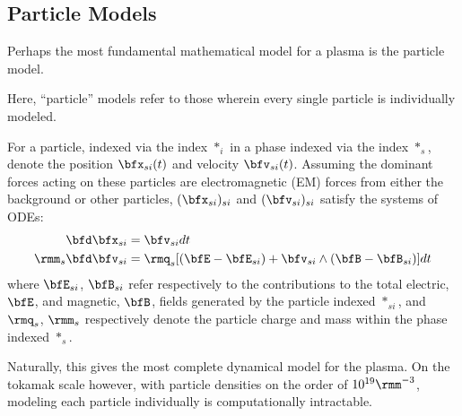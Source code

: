 \subsection{Particle Models}\label{cha:particle models}
    Perhaps the most fundamental mathematical model for a plasma is the particle model.

    \line

    \begin{definition}\label{def:particle model}
        Here, ``particle'' models refer to those wherein every single particle is individually modeled.
    \end{definition}
    
    \line

    For a particle, indexed via the index $*_{i}$ in a phase indexed via the index $*_{s}$, denote the position $\bfx_{si}(t)$ and velocity $\bfv_{si}(t)$. Assuming the dominant forces acting on these particles are electromagnetic (EM) forces from either the background or other particles, $(\bfx_{si})_{si}$ and $(\bfv_{si})_{si}$ satisfy the systems of ODEs:
    \begin{align}
        \bfd\bfx_{si}  &=  \bfv_{si} dt  \label{eqn:particle motion}  \\
        \rmm_{s}\bfd\bfv_{si}  &=  \rmq_{s}[(\bfE - \bfE_{si}) + \bfv_{si}\wedge(\bfB - \bfB_{si})]dt  \label{eqn:particle forcing}
    \end{align}
    where $\bfE_{si}$, $\bfB_{si}$ refer respectively to the contributions to the total electric, $\bfE$, and magnetic, $\bfB$, fields generated by the particle indexed $*_{si}$, and $\rmq_{s}$, $\rmm_{s}$ respectively denote the particle charge and mass within the phase indexed $*_{s}$.

    
    Naturally, this gives the most complete dynamical model for the plasma. On the tokamak scale however, with particle densities on the order of $10^{19}\rmm^{- 3}$, modeling each particle individually is computationally intractable.
    